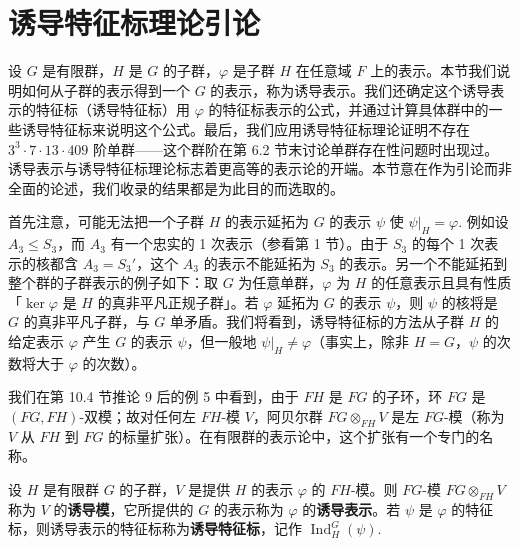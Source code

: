 \section{诱导特征标理论引论}

设 \(G\) 是有限群，\(H\) 是 \(G\) 的子群，\(\varphi\) 是子群 \(H\) 在任意域 \(F\) 上的表示。本节我们说明如何从子群的表示得到一个 \(G\) 的表示，称为诱导表示。我们还确定这个诱导表示的特征标（诱导特征标）用 \(\varphi\) 的特征标表示的公式，并通过计算具体群中的一些诱导特征标来说明这个公式。最后，我们应用诱导特征标理论证明不存在 \(3^3\cdot 7\cdot 13\cdot 409\) 阶单群——这个群阶在第 6.2 节末讨论单群存在性问题时出现过。诱导表示与诱导特征标理论标志着更高等的表示论的开端。本节意在作为引论而非全面的论述，我们收录的结果都是为此目的而选取的。

首先注意，可能无法把一个子群 \(H\) 的表示延拓为 \(G\) 的表示 \(\psi\) 使 \(\psi|_H = \varphi\). 例如设 \(A_3 \leq S_3\)，而 \(A_3\) 有一个忠实的 1 次表示（参看第 1 节）。由于 \(S_3\) 的每个 1 次表示的核都含 \(A_3 = S_3'\)，这个 \(A_3\) 的表示不能延拓为 \(S_3\) 的表示。另一个不能延拓到整个群的子群表示的例子如下：取 \(G\) 为任意单群，\(\varphi\) 为 \(H\) 的任意表示且具有性质「\(\ker\varphi\) 是 \(H\) 的真非平凡正规子群」。若 \(\varphi\) 延拓为 \(G\) 的表示 \(\psi\)，则 \(\psi\) 的核将是 \(G\) 的真非平凡子群，与 \(G\) 单矛盾。我们将看到，诱导特征标的方法从子群 \(H\) 的给定表示 \(\varphi\) 产生 \(G\) 的表示 \(\psi\)，但一般地 \(\psi|_H \neq \varphi\)（事实上，除非 \(H = G\)，\(\psi\) 的次数将大于 \(\varphi\) 的次数）。

我们在第 10.4 节推论 9 后的例 5 中看到，由于 \(FH\) 是 \(FG\) 的子环，环 \(FG\) 是 \((FG, FH)\)-双模；故对任何左 \(FH\)-模 \(V\)，阿贝尔群 \(FG \otimes_{FH}V\) 是左 \(FG\)-模（称为 \(V\) 从 \(FH\) 到 \(FG\) 的标量扩张）。在有限群的表示论中，这个扩张有一个专门的名称。

\begin{definition}
设 \(H\) 是有限群 \(G\) 的子群，\(V\) 是提供 \(H\) 的表示 \(\varphi\) 的 \(FH\)-模。则 \(FG\)-模 \(FG \otimes_{FH}V\) 称为 \(V\) 的\textbf{诱导模}，它所提供的 \(G\) 的表示称为 \(\varphi\) 的\textbf{诱导表示}。若 \(\psi\) 是 \(\varphi\) 的特征标，则诱导表示的特征标称为\textbf{诱导特征标}，记作 \(\operatorname{Ind}_H^G(\psi)\).
\end{definition}

